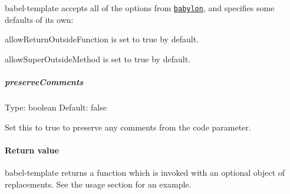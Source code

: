 {\ttfamily babel-\/template} accepts all of the options from \href{https://github.com/babel/babylon#options}{\tt babylon}, and specifies some defaults of its own\+:


\begin{DoxyItemize}
\item {\ttfamily allow\+Return\+Outside\+Function} is set to {\ttfamily true} by default.
\item {\ttfamily allow\+Super\+Outside\+Method} is set to {\ttfamily true} by default.
\end{DoxyItemize}

\subparagraph*{preserve\+Comments}

Type\+: {\ttfamily boolean} Default\+: {\ttfamily false}

Set this to {\ttfamily true} to preserve any comments from the {\ttfamily code} parameter.

\paragraph*{Return value}

{\ttfamily babel-\/template} returns a {\ttfamily function} which is invoked with an optional object of replacements. See the usage section for an example. 